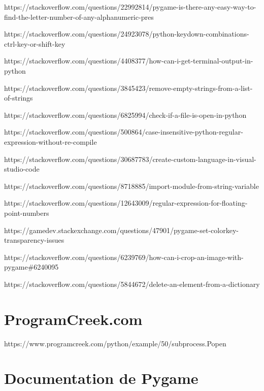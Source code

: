 \documentclass{report}
\begin{document}
\par https://stackoverflow.com/questions/22992814/pygame-is-there-any-easy-way-to-find-the-letter-number-of-any-alphanumeric-pres
\newline\par https://stackoverflow.com/questions/24923078/python-keydown-combinations-ctrl-key-or-shift-key
\newline\par https://stackoverflow.com/questions/4408377/how-can-i-get-terminal-output-in-python
\newline\par https://stackoverflow.com/questions/3845423/remove-empty-strings-from-a-list-of-strings
\newline\par https://stackoverflow.com/questions/6825994/check-if-a-file-is-open-in-python
\newline\par https://stackoverflow.com/questions/500864/case-insensitive-python-regular-expression-without-re-compile
\newline\par https://stackoverflow.com/questions/30687783/create-custom-language-in-visual-studio-code
\newline\par https://stackoverflow.com/questions/8718885/import-module-from-string-variable
\newline\par https://stackoverflow.com/questions/12643009/regular-expression-for-floating-point-numbers
\newline\par https://gamedev.stackexchange.com/questions/47901/pygame-set-colorkey-transparency-issues
\newline\par https://stackoverflow.com/questions/6239769/how-can-i-crop-an-image-with-pygame\#6240095
\newline\par https://stackoverflow.com/questions/5844672/delete-an-element-from-a-dictionary

\section*{ProgramCreek.com}

https://www.programcreek.com/python/example/50/subprocess.Popen

\section*{Documentation de Pygame}
\end{document}
